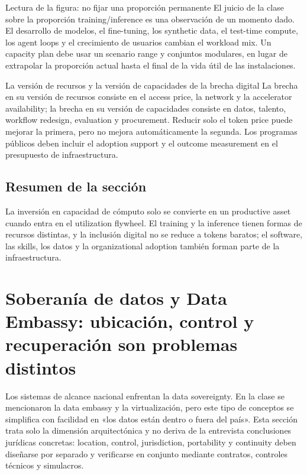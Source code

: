 \documentclass[a4paper]{article}
\begin{document}
\begin{knowledgebox}{Lectura de la figura: no fijar una proporción permanente}
El juicio de la clase sobre la proporción training/inference es una observación de un momento dado. El desarrollo de modelos, el fine-tuning, los synthetic data, el test-time compute, los agent loops y el crecimiento de usuarios cambian el workload mix. Un capacity plan debe usar un scenario range y conjuntos modulares, en lugar de extrapolar la proporción actual hasta el final de la vida útil de las instalaciones.
\end{knowledgebox}

\begin{importantbox}{La versión de recursos y la versión de capacidades de la brecha digital}
La brecha en su versión de recursos consiste en el access price, la network y la accelerator availability; la brecha en su versión de capacidades consiste en datos, talento, workflow redesign, evaluation y procurement. Reducir solo el token price puede mejorar la primera, pero no mejora automáticamente la segunda. Los programas públicos deben incluir el adoption support y el outcome measurement en el presupuesto de infraestructura.
\end{importantbox}

\subsection{Resumen de la sección}

La inversión en capacidad de cómputo solo se convierte en un productive asset cuando entra en el utilization flywheel. El training y la inference tienen formas de recursos distintas, y la inclusión digital no se reduce a tokens baratos; el software, las skills, los datos y la organizational adoption también forman parte de la infraestructura.
\section{Soberanía de datos y Data Embassy: ubicación, control y recuperación son problemas distintos}

Los sistemas de alcance nacional enfrentan la data sovereignty. En la clase se mencionaron la data embassy y la virtualización, pero este tipo de conceptos se simplifica con facilidad en «los datos están dentro o fuera del país». Esta sección trata solo la dimensión arquitectónica y no deriva de la entrevista conclusiones jurídicas concretas: location, control, jurisdiction, portability y continuity deben diseñarse por separado y verificarse en conjunto mediante contratos, controles técnicos y simulacros.
\end{document}
